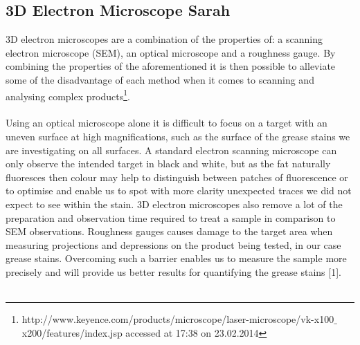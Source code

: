 \documentclass[a4paper ,12pt]{article}
\begin{document}
\subsection{3D Electron Microscope Sarah}
3D electron microscopes are a combination of the properties of: a scanning electron microscope (SEM), an optical microscope and a roughness gauge. By combining the properties of the aforementioned it is then possible to alleviate some of the disadvantage of each method when it comes to scanning and analysing complex products\footnote{http://www.keyence.com/products/microscope/laser-microscope/vk-x100$\_$x200/features/index.jsp accessed at 17:38 on 23.02.2014}.\\\\Using an optical microscope alone it is difficult to focus on a target with an uneven surface at high magnifications, such as the surface of the grease stains we are investigating on all surfaces.
A standard electron scanning microscope can only observe the intended target in black and white, but as the fat naturally fluoresces then colour may help to distinguish between patches of fluorescence or to optimise and enable us to spot with more clarity unexpected traces we did not expect to see within the stain. 3D electron microscopes also remove a lot of the preparation and observation time required to treat a sample in comparison to SEM observations. Roughness gauges causes damage to the target area when measuring projections and depressions on the product being tested, in our case grease stains. Overcoming such a barrier enables us to measure the sample more precisely and will provide us better results for quantifying the grease stains [1].\\\\
\end{document}
